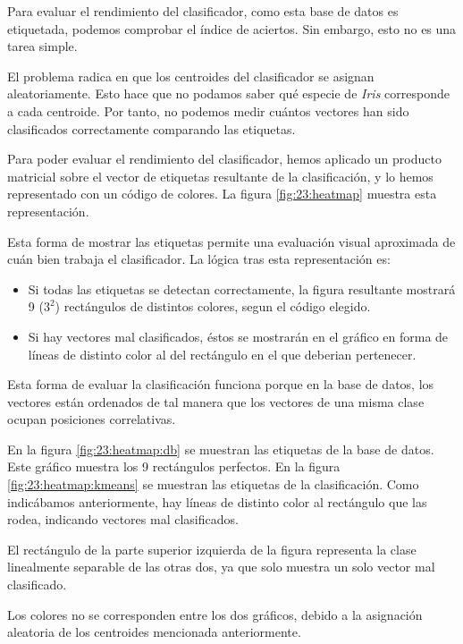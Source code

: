 \documentclass[11pt]{article} %
\begin{document}
Para evaluar el rendimiento del clasificador, como esta base de datos es
etiquetada, podemos comprobar el índice de aciertos. Sin embargo, esto no es una
tarea simple.

El problema radica en que los centroides del clasificador se asignan
aleatoriamente. Esto hace que no podamos saber qué especie de \emph{Iris}
corresponde a cada centroide. Por tanto, no podemos medir cuántos vectores han
sido clasificados correctamente comparando las etiquetas.

Para poder evaluar el rendimiento del clasificador, hemos aplicado un producto
matricial sobre el vector de etiquetas resultante de la clasificación, y lo
hemos representado con un código de colores. La figura \ref{fig:23:heatmap} muestra esta
representación.

Esta forma de mostrar las etiquetas permite una evaluación visual aproximada de
cuán bien trabaja el clasificador. La lógica tras esta representación es:

\begin{itemize}
    \item Si todas las etiquetas se detectan correctamente, la figura resultante
        mostrará 9 ($3^2$) rectángulos de distintos colores, segun el código elegido.
    \item Si hay vectores mal clasificados, éstos se mostrarán en el gráfico en
        forma de líneas de distinto color al del rectángulo en el que deberian
        pertenecer.
\end{itemize}

Esta forma de evaluar la clasificación funciona porque en la base de datos, los
vectores están ordenados de tal manera que los vectores de una misma clase
ocupan posiciones correlativas.

En la figura \ref{fig:23:heatmap:db} se muestran las etiquetas de la base de
datos. Este gráfico muestra los 9 rectángulos perfectos. En la figura
\ref{fig:23:heatmap:kmeans} se muestran las etiquetas de la clasificación. Como
indicábamos anteriormente, hay líneas de distinto color al rectángulo que las
rodea, indicando vectores mal clasificados.

El rectángulo de la parte superior izquierda de la figura representa la clase
linealmente separable de las otras dos, ya que solo muestra un solo vector mal
clasificado.

Los colores no se corresponden entre los dos gráficos, debido a la asignación
aleatoria de los centroides mencionada anteriormente.
\end{document}
